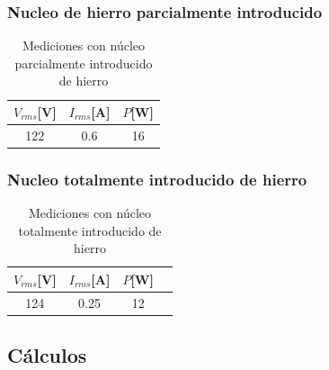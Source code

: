 \documentclass{article}
\begin{document}
        \subsubsection{Nucleo de hierro parcialmente introducido}

        \begin{table}[H]
            \centering
            \begin{tabular}{|c|c|c|}
                \hline
                $V_{rms} $[V] & $I_{rms} $[A] & $P $[W] \\ \hline
                122           & 0.6         & 16    \\ \hline
            \end{tabular}
            \caption{Mediciones con núcleo parcialmente introducido de hierro}
            \label{tab:mediciones-nucleo-parcialmente-introducido-hierro}
        \end{table}

        \subsubsection{Nucleo totalmente introducido de hierro}

        \begin{table}[H]
            \centering
            \begin{tabular}{|c|c|c|c|}
                \hline
                $V_{rms} $[V] & $I_{rms} $[A] & $P $[W] \\ \hline
                124           & 0.25         & 12    \\ \hline
            \end{tabular}
            \caption{Mediciones con núcleo totalmente introducido de hierro}
            \label{tab:mediciones-nucleo-totalmente-introducido-hierro}
        \end{table}

    \subsection{Cálculos}
\end{document}

